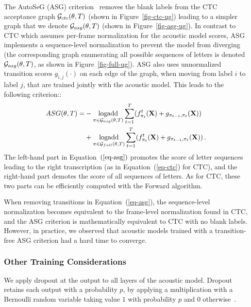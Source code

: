 \documentclass{article}
\DeclareMathOperator*{\logadd}{logadd}
\begin{document}
The AutoSeG (ASG) criterion~\citep{collobert2016wav2letter} removes the
blank labels from the CTC acceptance graph ${\cal G}_{ctc}(\theta, T)$
(shown in Figure~\ref{fig-ctc-ug}) leading to a simpler graph that we
denote ${\cal G}_{asg}(\theta, T)$ (shown in Figure~\ref{fig-asg-ug}). In
contrast to CTC which assumes per-frame normalization for the acoustic
model scores, ASG implements a sequence-level normalization to prevent the
model from diverging (the corresponding graph enumerating all possible
sequences of letters is denoted ${\cal G}_{asg}(\theta, T)$, as shown in
Figure~\ref{fig-full-ug}). ASG also uses unnormalized transition scores
$g_{i,j}(\cdot)$ on each edge of the graph, when moving from label $i$ to
label $j$, that are trained jointly with the acoustic model. 
This leads to the following criterion::
\begin{equation}
  \label{eq-asg}
  \begin{split}
    ASG(\theta, T) = & - \logadd_{\pi \in {\cal G}_{asg}(\theta, T)} \sum_{t=1}^T (f^t_{\pi_t}(\mathbf{X})+g_{\pi_{t-1},\pi_t}(\mathbf{X})) \\
    & + \logadd_{\pi \in {\cal G}_{full}(\theta, T)} \sum_{t=1}^T (f^t_{\pi_t}(\mathbf{X})+g_{\pi_{t-1},\pi_t}(\mathbf{X})) \,.
  \end{split}
\end{equation}
The left-hand part in Equation~$(\ref{eq-asg})$ promotes the score of
letter sequences leading to the right transcription (as in
Equation~(\ref{eq-ctc}) for CTC), and the right-hand part demotes the score
of all sequences of letters.
As for CTC, these two parts can be efficiently computed with the Forward
algorithm.

When removing transitions in Equation~(\ref{eq-asg}), the sequence-level
normalization becomes equivalent to the frame-level normalization found in
CTC, and the ASG criterion is mathematically equivalent to CTC with no
blank labels. However, in practice, we observed that acoustic models
trained with a transition-free ASG criterion had a hard time to converge.





\subsubsection{Other Training Considerations}
\label{sec-dropout}

We apply dropout at the output to all layers of the acoustic model. Dropout
retains each output with a probability $p$, by applying a multiplication
with a Bernoulli random variable taking value $1$ with probability $p$
and $0$ otherwise~\citep{srivastava2014dropout}.
\end{document}
